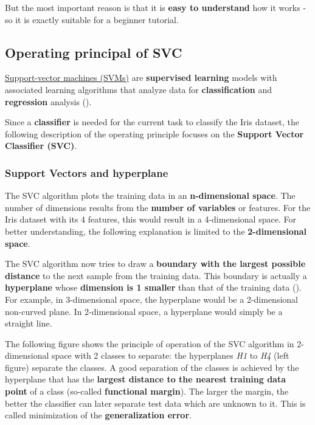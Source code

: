 \documentclass [oneside,10pt,a4paper,ngerman,BCOR10mm,headsepline,parindent,final]{scrartcl}
\begin{document}
But the most important reason is that it is \textbf{easy to understand}
how it works - so it is exactly suitable for a beginner tutorial.

    \hypertarget{operating-principal-of-svc}{%
\subsection{Operating principal of
SVC}\label{operating-principal-of-svc}}

\href{https://en.wikipedia.org/wiki/Support-vector_machine}{Support-vector
machines (SVMs)} are \textbf{supervised learning} models with associated
learning algorithms that analyze data for \textbf{classification} and
\textbf{regression} analysis (\cite{Wiki_SVM}).

Since a \textbf{classifier} is needed for the current task to classify
the Iris dataset, the following description of the operating principle
focuses on the \textbf{Support Vector Classifier (SVC)}.

    \hypertarget{support-vectors-and-hyperplane}{%
\subsubsection{Support Vectors and
hyperplane}\label{support-vectors-and-hyperplane}}

The SVC algorithm plots the training data in an \textbf{n-dimensional
space}. The number of dimensions results from the \textbf{number of
variables} or features. For the Iris dataset with its 4 features, this
would result in a 4-dimensional space. For better understanding, the
following explanation is limited to the \textbf{2-dimensional space}.

The SVC algorithm now tries to draw a \textbf{boundary with the largest
possible distance} to the next sample from the training data. This
boundary is actually a \textbf{hyperplane} whose \textbf{dimension is 1
smaller} than that of the training data (\cite{SVM_Python_2019}). For
example, in 3-dimensional space, the hyperplane would be a 2-dimensional
non-curved plane. In 2-dimensional space, a hyperplane would simply be a
straight line.

The following figure shows the principle of operation of the SVC
algorithm in 2-dimensional space with 2 classes to separate: the
hyperplanes \emph{H1} to \emph{H4} (left figure) separate the classes. A
good separation of the classes is achieved by the hyperplane that has
the \textbf{largest distance to the nearest training data point} of a
class (so-called \textbf{functional margin}). The larger the margin, the
better the classifier can later separate test data which are unknown to
it. This is called minimization of the \textbf{generalization error}.
\end{document}
